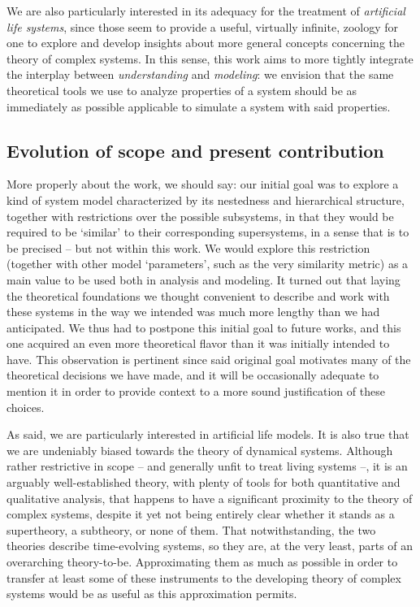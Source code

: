 We are also particularly interested in its adequacy for the treatment of \textit{artificial life systems}, since those seem to provide a useful, virtually infinite, zoology for one to explore and develop insights about more general concepts concerning the theory of complex systems. In this sense, this work aims to more tightly integrate the interplay between \textit{understanding} and \textit{modeling}: we envision that the same theoretical tools we use to analyze properties of a system should be as immediately as possible applicable to simulate a system with said properties. 

\subsection{Evolution of scope and present contribution}

More properly about the work, we should say: our initial goal was to explore a kind of system model characterized by its nestedness and hierarchical structure, together with restrictions over the possible subsystems, in that they would be required to be `similar' to their corresponding supersystems, in a sense that is to be precised -- but not within this work. We would explore this restriction (together with other model `parameters', such as the very similarity metric) as a main value to be used both in analysis and modeling. It turned out that laying the theoretical foundations we thought convenient to describe and work with these systems in the way we intended was much more lengthy than we had anticipated. We thus had to postpone this initial goal to future works, and this one acquired an even more theoretical flavor than it was initially intended to have. This observation is pertinent since said original goal motivates many of the theoretical decisions we have made, and it will be occasionally adequate to mention it in order to provide context to a more sound justification of these choices.

As said, we are particularly interested in artificial life models. It is also true that we are undeniably biased towards the theory of dynamical systems. Although rather restrictive in scope -- and generally unfit to treat living systems --, it is an arguably well-established theory, with plenty of tools for both quantitative and qualitative analysis, that happens to have a significant proximity to the theory of complex systems, despite it yet not being entirely clear whether it stands as a supertheory, a subtheory, or none of them. That notwithstanding, the two theories describe time-evolving systems, so they are, at the very least, parts of an overarching theory-to-be. Approximating them as much as possible in order to transfer at least some of these instruments to the developing theory of complex systems would be as useful as this approximation permits.

